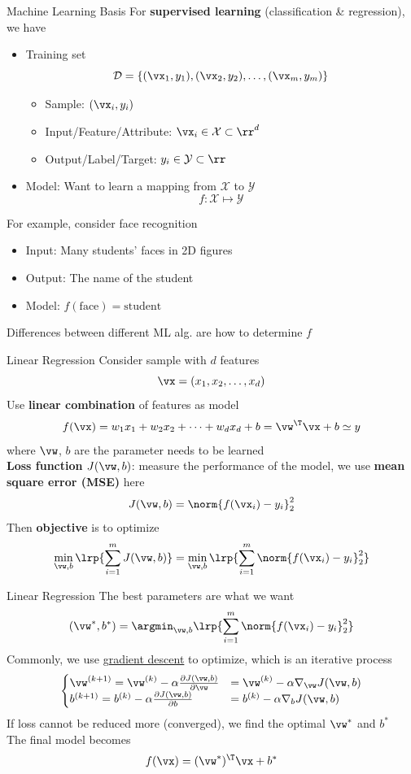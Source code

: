 \documentclass{../TexTemplate/myslide}
\begin{document}
\begin{frame}{Machine Learning Basis}
For \textbf{supervised learning} (classification \& regression), we have
\begin{itemize}
	\item Training set
	\[\mathcal{D}=\{(\vx_1,y_1),(\vx_2,y_2),\ldots,(\vx_m,y_m)\}\]
	\begin{itemize}
		\item Sample: $(\vx_i,y_i)$
		\item Input/Feature/Attribute: $\vx_i\in\mathcal{X}\subset\rr^d$
		\item Output/Label/Target: $y_i\in\mathcal{Y}\subset\rr$
	\end{itemize}
	\item Model: Want to learn a mapping from $\mathcal{X}$ to $\mathcal{Y}$
	\[f:\mathcal{X}\mapsto\mathcal{Y}\]
\end{itemize}
For example, consider face recognition
\begin{itemize}
	\item Input: Many students' faces in 2D figures
	\item Output: The name of the student
	\item Model: $f(\text{face})=\text{student}$
\end{itemize}
Differences between different ML alg. are how to determine $f$
\end{frame}

\begin{frame}{Linear Regression}
Consider sample with $d$ features
\[\vx=(x_1,x_2,\ldots,x_d)\]
Use \textbf{linear combination} of features as model
\[f(\vx)=w_1x_1+w_2x_2+\cdots+w_dx_d+b=\vw^\T\vx+b\simeq y\]
where $\vw$, $b$ are the parameter needs to be learned\\
\textbf{Loss function} $J(\vw,b)$: measure the performance of the model, we use \textbf{mean square error (MSE)} here
\[J(\vw,b) = \norm{f(\vx_i)-y_i}_2^2\]
Then \textbf{objective} is to optimize
\[\min_{\vw,b} \lrp{\sum_{i=1}^m J(\vw,b)} = \min_{\vw,b} \lrp{\sum_{i=1}^m \norm{f(\vx_i)-y_i}_2^2}\]
\end{frame}

\begin{frame}{Linear Regression}
The best parameters are what we want
\[(\vw^*,b^*)=\argmin_{\vw,b}\lrp{\sum_{i=1}^m \norm{f(\vx_i)-y_i}_2^2}\]
Commonly, we use \href{https://xavierbourretsicotte.github.io/animation_ridge.html}{gradient descent} to optimize, which is an iterative process
\[\begin{cases}
\vw^{(k+1)} = \vw^{(k)} - \alpha\frac{\partial J(\vw,b)}{\partial \vw} &= \vw^{(k)} - \alpha\nabla_{\vw}{J(\vw,b)}\\
b^{(k+1)} = b^{(k)} - \alpha\frac{\partial J(\vw,b)}{\partial b} &= b^{(k)} - \alpha\nabla_{b}{J(\vw,b)}
\end{cases}\]
If loss cannot be reduced more (converged), we find the optimal $\vw^*$ and $b^*$\\
The final model becomes
\[f(\vx)=(\vw^*)^\T\vx+b^*\]
\end{frame}
\end{document}
